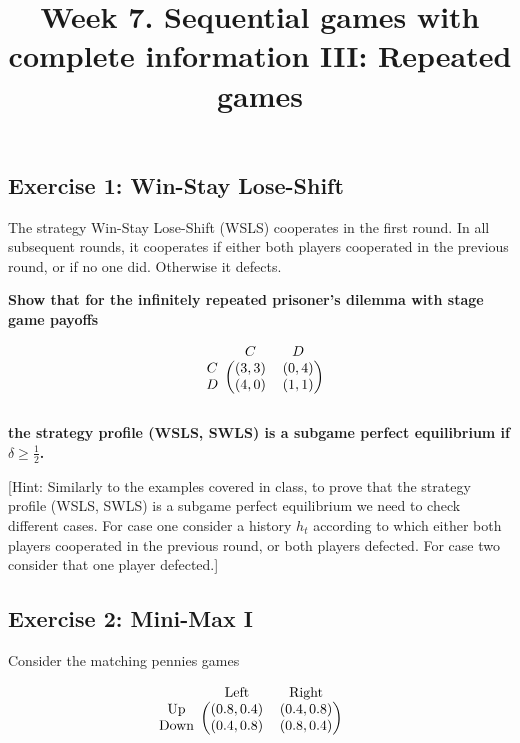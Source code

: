 \documentclass[10pt]{article}
\title{\textbf{Week 7.} Sequential games with complete information III: Repeated games}
\date{}
\begin{document}
\maketitle

\subsection*{Exercise 1: Win-Stay Lose-Shift}

The strategy Win-Stay Lose-Shift (WSLS) cooperates in the first round. In all
subsequent rounds, it cooperates if either both players cooperated in the
previous round, or if no one did. Otherwise it defects.

\textbf{Show that for the infinitely repeated prisoner's dilemma with stage game
payoffs}

\begin{equation*}
    \begin{blockarray}{ccc}
        & C & D \\
        \begin{block}{c(cc)}
            C & (3, 3) & (0, 4) \\
            D & (4, 0) & (1, 1) \\
        \end{block}
    \end{blockarray}
\end{equation*}

\textbf{the strategy profile (WSLS, SWLS) is a subgame perfect equilibrium if
\(\delta \geq \frac{1}{2}\).}

[Hint: Similarly to the examples covered in class, to prove that the strategy
profile (WSLS, SWLS) is a subgame perfect equilibrium we need to check different
cases. For case one consider a history \(h_t\) according to which either both
players cooperated in the previous round, or both players defected. For case two
consider that one player defected.]

\subsection*{Exercise 2: Mini-Max I}

Consider the matching pennies games

\begin{equation*}
    \begin{blockarray}{ccc}
        & \text{Left} & \text{Right} \\
        \begin{block}{c(cc)}
            \text{Up} &    (0.8, 0.4) & (0.4, 0.8) \\
            \text{Down} & (0.4, 0.8) & (0.8, 0.4) \\
        \end{block}
    \end{blockarray}\qquad
    \end{equation*}
\end{document}
